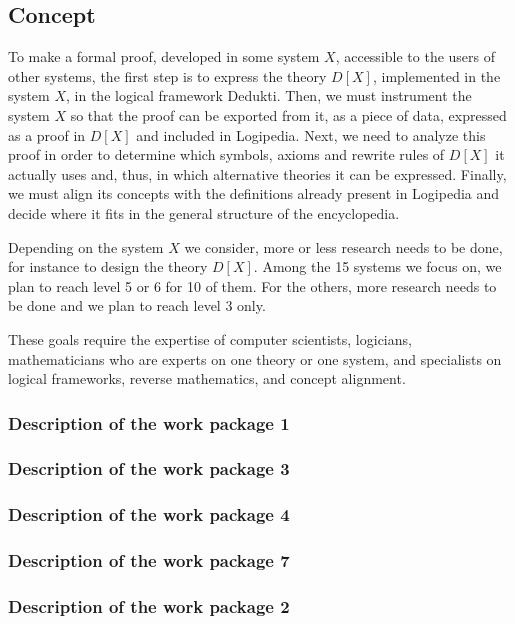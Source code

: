 \subsection{Concept}

To make a formal proof, developed in some system $X$, accessible to
the users of other systems, the first step is to express the theory
$D[X]$, implemented in the system $X$, in the logical framework {\textsf
  Dedukti}.  Then, we must instrument the system $X$ so that the proof
can be exported from it, as a piece of data, expressed as a proof in
$D[X]$ and included in {\textsf Logipedia}. Next, we need to analyze this
proof in order to determine which symbols, axioms and rewrite rules of
$D[X]$ it actually uses and, thus, in which alternative theories it
can be expressed.  Finally, we must align its concepts with the
definitions already present in {\textsf Logipedia} and decide where it
fits in the general structure of the encyclopedia.

Depending on the system $X$ we consider, more or less research needs
to be done, for instance to design the theory $D[X]$. Among the 15
systems we focus on, we plan to reach level 5 or 6 for 10 of them.
For the others, more research needs to be done and we plan to reach
level 3 only.

These goals require the expertise of computer scientists, logicians,
mathematicians who are experts on one theory or one system, and
specialists on logical frameworks, reverse mathematics, and concept
alignment.

\subsubsection{Description of the work package 1}

\subsubsection{Description of the work package 3}

\subsubsection{Description of the work package 4}

\subsubsection{Description of the work package 7}

\subsubsection{Description of the work package 2}

